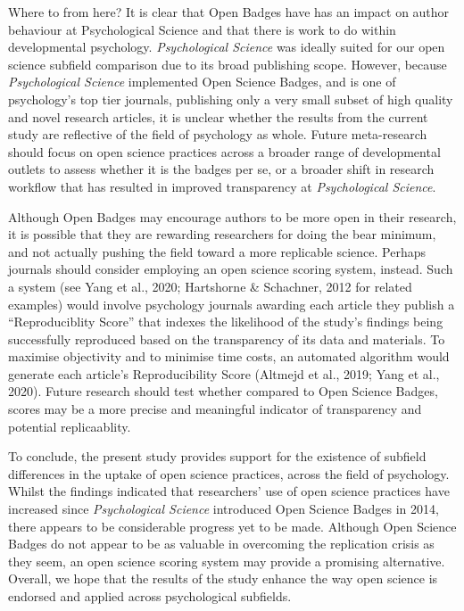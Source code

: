 \documentclass[
  english,
  man,floatsintext]{apa6}
\begin{document}
Where to from here? It is clear that Open Badges have has an impact on author behaviour at Psychological Science and that there is work to do within developmental psychology. \emph{Psychological Science} was ideally suited for our open science subfield comparison due to its broad publishing scope. However, because \emph{Psychological Science} implemented Open Science Badges, and is one of psychology's top tier journals, publishing only a very small subset of high quality and novel research articles, it is unclear whether the results from the current study are reflective of the field of psychology as whole. Future meta-research should focus on open science practices across a broader range of developmental outlets to assess whether it is the badges per se, or a broader shift in research workflow that has resulted in improved transparency at \emph{Psychological Science}.

Although Open Badges may encourage authors to be more open in their research, it is possible that they are rewarding researchers for doing the bear minimum, and not actually pushing the field toward a more replicable science. Perhaps journals should consider employing an open science scoring system, instead. Such a system (see Yang et al., 2020; Hartshorne \& Schachner, 2012 for related examples) would involve psychology journals awarding each article they publish a ``Reproduciblity Score'' that indexes the likelihood of the study's findings being successfully reproduced based on the transparency of its data and materials. To maximise objectivity and to minimise time costs, an automated algorithm would generate each article's Reproducibility Score (Altmejd et al., 2019; Yang et al., 2020). Future research should test whether compared to Open Science Badges, scores may be a more precise and meaningful indicator of transparency and potential replicaablity.

To conclude, the present study provides support for the existence of subfield differences in the uptake of open science practices, across the field of psychology. Whilst the findings indicated that researchers' use of open science practices have increased since \emph{Psychological Science} introduced Open Science Badges in 2014, there appears to be considerable progress yet to be made. Although Open Science Badges do not appear to be as valuable in overcoming the replication crisis as they seem, an open science scoring system may provide a promising alternative. Overall, we hope that the results of the study enhance the way open science is endorsed and applied across psychological subfields.
\end{document}
